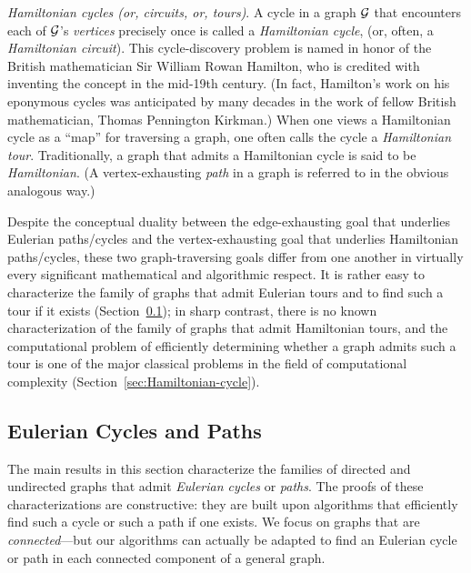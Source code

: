 \medskip

 
 
 

{\it Hamiltonian cycles (or, circuits, or, tours)}.
A cycle in a graph $\mbox{$\cal G$}$ that encounters each of $\mbox{$\cal G$}$'s {\em vertices} precisely once is called a {\it Hamiltonian cycle}, (or, often, a {\it Hamiltonian circuit}).  This cycle-discovery problem is named in honor of the British mathematician Sir William Rowan Hamilton, who is credited with inventing the
concept in the mid-19th century.  (In fact, Hamilton's work on his eponymous cycles was anticipated by many decades in the work of fellow British mathematician, Thomas Pennington Kirkman.)  When one views a Hamiltonian cycle as a ``map'' for traversing a graph, one often calls the cycle a {\it Hamiltonian tour}.  Traditionally, a graph that admits a Hamiltonian cycle is said to be {\it Hamiltonian}.  (A vertex-exhausting {\em path} in a graph is referred to in the obvious analogous way.)  
   

\bigskip

Despite the conceptual duality between the edge-exhausting goal that underlies Eulerian paths/cycles and the vertex-exhausting goal that underlies Hamiltonian paths/cycles, these two graph-traversing goals differ from one another in virtually every significant mathematical and algorithmic respect.  It is rather easy to characterize the family of graphs that admit Eulerian tours and to find such a tour if it exists (Section~\ref{sec:EulerianCycle}); in sharp contrast, there is no known characterization of the family of graphs that admit Hamiltonian tours, and the computational problem of efficiently determining whether a graph admits such a tour is one of the major classical problems in the field of computational complexity  (Section~\ref{sec:Hamiltonian-cycle}).


\subsection{Eulerian Cycles and Paths}
\label{sec:EulerianCycle}

The main results in this section characterize the families of directed and undirected graphs that admit {\it Eulerian cycles} or {\it paths}.  The proofs of these characterizations are constructive: they are built upon algorithms that efficiently find such a cycle or such a path if one exists.  We focus on graphs that are {\em connected}---but our algorithms can actually be adapted to find an Eulerian cycle or path in each connected component of a general graph.

